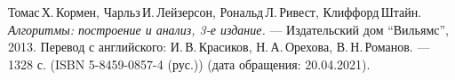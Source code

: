 \begin{thebibliography}{99}
Томас\,Х.\,Кормен, Чарльз\,И.\,Лейзерсон, Рональд\,Л.\,Ривест, Клиффорд\,Штайн.
{\itshape Алгоритмы: построение и анализ, 3-е издание.} --- Издательский дом \enquote{Вильямс}, 2013. Перевод с английского: И.\,В.\,Красиков, Н.\,А.\,Орехова, В.\,Н.\,Романов. --- 1328 с. (ISBN 5-8459-0857-4 (рус.)) (дата обращения: 20.04.2021).
\end{thebibliography}
\pagebreak